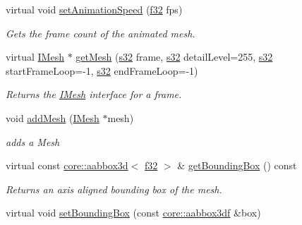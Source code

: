 \begin{DoxyCompactItemize}
virtual void \hyperlink{structirr_1_1scene_1_1SAnimatedMesh_ae7a32638fe5c59007d044bbc3c170108}{set\+Animation\+Speed} (\hyperlink{namespaceirr_a0277be98d67dc26ff93b1a6a1d086b07}{f32} fps)
\begin{DoxyCompactList}\small\item\em Gets the frame count of the animated mesh. \end{DoxyCompactList}\item 
virtual \hyperlink{classirr_1_1scene_1_1IMesh}{I\+Mesh} $\ast$ \hyperlink{structirr_1_1scene_1_1SAnimatedMesh_a132d5f643fe02b57480d945e8d5be2d2}{get\+Mesh} (\hyperlink{namespaceirr_ac66849b7a6ed16e30ebede579f9b47c6}{s32} frame, \hyperlink{namespaceirr_ac66849b7a6ed16e30ebede579f9b47c6}{s32} detail\+Level=255, \hyperlink{namespaceirr_ac66849b7a6ed16e30ebede579f9b47c6}{s32} start\+Frame\+Loop=-\/1, \hyperlink{namespaceirr_ac66849b7a6ed16e30ebede579f9b47c6}{s32} end\+Frame\+Loop=-\/1)
\begin{DoxyCompactList}\small\item\em Returns the \hyperlink{classirr_1_1scene_1_1IMesh}{I\+Mesh} interface for a frame. \end{DoxyCompactList}\item 
\mbox{\label{structirr_1_1scene_1_1SAnimatedMesh_a45bacd8ae07d47db3a204d3fd8d8bc50}} 
void \hyperlink{structirr_1_1scene_1_1SAnimatedMesh_a45bacd8ae07d47db3a204d3fd8d8bc50}{add\+Mesh} (\hyperlink{classirr_1_1scene_1_1IMesh}{I\+Mesh} $\ast$mesh)
\begin{DoxyCompactList}\small\item\em adds a Mesh \end{DoxyCompactList}\item 
virtual const \hyperlink{classirr_1_1core_1_1aabbox3d}{core\+::aabbox3d}$<$ \hyperlink{namespaceirr_a0277be98d67dc26ff93b1a6a1d086b07}{f32} $>$ \& \hyperlink{structirr_1_1scene_1_1SAnimatedMesh_a1494406ce8f11d47fd1e3b4af825e88f}{get\+Bounding\+Box} () const
\begin{DoxyCompactList}\small\item\em Returns an axis aligned bounding box of the mesh. \end{DoxyCompactList}\item 
\mbox{\label{structirr_1_1scene_1_1SAnimatedMesh_ab33614f8ef158c79260d555f69055bf5}} 
virtual void \hyperlink{structirr_1_1scene_1_1SAnimatedMesh_ab33614f8ef158c79260d555f69055bf5}{set\+Bounding\+Box} (const \hyperlink{namespaceirr_1_1core_adfc8fa01b30044c55f3332a1d6c1aa19}{core\+::aabbox3df} \&box)

\end{DoxyCompactItemize}
